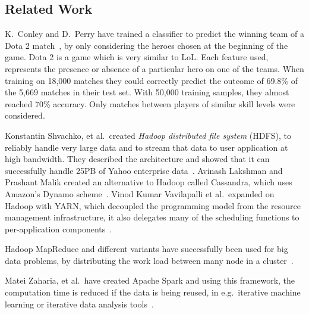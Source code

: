 \subsection{Related Work}\label{sec:relatedwork}
K.\ Conley and D.\ Perry have trained a classifier to predict the winning team of a Dota 2 match~\cite{dota2article}, by only considering the heroes chosen at the beginning of the game. Dota 2 is a game which is very similar to LoL.\@
Each feature used, represents the presence or absence of a particular hero on one of the teams.
When training on 18,000 matches they could correctly predict the outcome of 69.8\% of the 5,669 matches in their test set.
With 50,000 training samples, they almost reached 70\% accuracy. Only matches between players of similar skill levels were considered.

Konstantin Shvachko, et al.\, created \emph{Hadoop distributed file system} (HDFS), to reliably handle very large data and to stream that data to user application at high bandwidth. They described the architecture and showed that it can successfully handle 25PB of Yahoo enterprise data~\cite{HDFS}.
Avinash Lakshman and Prashant Malik created an alternative to Hadoop called Cassandra, which uses Amazon's Dynamo scheme~\cite{ApacheCassandra}.
Vinod Kumar Vavilapalli et al.\ expanded on Hadoop with YARN, which decoupled the programming model from the resource management infrastructure, it also delegates many of the scheduling functions to per-application components~\cite{ApacheHadoopYARN}.

Hadoop MapReduce and different variants have successfully been used for big data problems, by distributing the work load between many node in a cluster~\cite{DeanMapReduce}. 

Matei Zaharia, et al.\ have created Apache Spark and using this framework, the computation time is reduced if the data is being reused, in e.g.\ iterative machine learning or iterative data analysis tools~\cite{ApacheSpark}.



